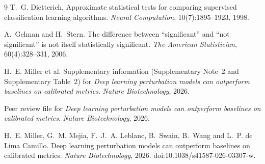 \documentclass[11pt]{article}
\theoremstyle{definition}
\begin{document}
\begin{thebibliography}{9}
T.~G. Dietterich.
\newblock Approximate statistical tests for comparing supervised classification learning algorithms.
\newblock \emph{Neural Computation}, 10(7):1895--1923, 1998.

A.~Gelman and H.~Stern.
\newblock The difference between ``significant'' and ``not significant'' is not itself statistically significant.
\newblock \emph{The American Statistician}, 60(4):328--331, 2006.

H.~E. Miller et al.
\newblock Supplementary information (Supplementary Note~2 and Supplementary Table~2) for \emph{Deep learning perturbation models can outperform baselines on calibrated metrics}.
\newblock \emph{Nature Biotechnology}, 2026.

\newblock Peer review file for \emph{Deep learning perturbation models can outperform baselines on calibrated metrics}.
\newblock \emph{Nature Biotechnology}, 2026.

H.~E. Miller, G.~M. Mejia, F.~J.~A. Leblanc, B.~Swain, B.~Wang and L.~P. de Lima Camillo.
\newblock Deep learning perturbation models can outperform baselines on calibrated metrics.
\newblock \emph{Nature Biotechnology}, 2026. doi:10.1038/s41587-026-03307-w.
\end{thebibliography}
\end{document}
